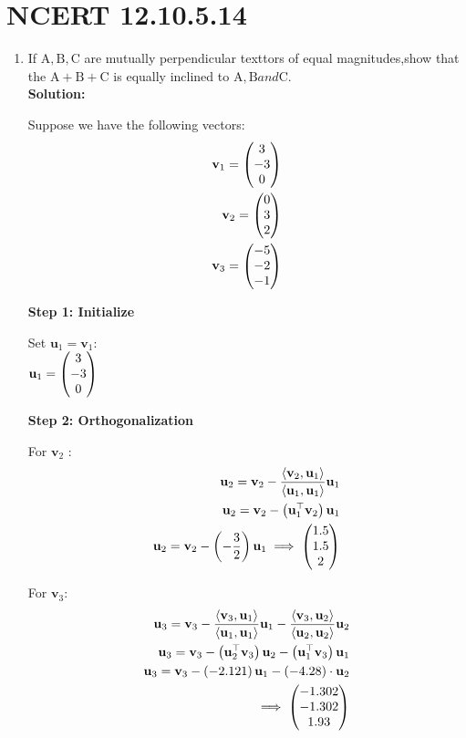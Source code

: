 \documentclass[11pt]{book}
\begin{document}
\section*{NCERT 12.10.5.14}
\begin{enumerate}
    \item If $ \text{A},\text{B},\text{C} $ are mutually perpendicular texttors of equal magnitudes,show that the  $ \text{A}+\text{B}+\text{C} $ is equally inclined to $ \text{A},\text{B} and \text{C} $.\\
    \textbf{Solution:}
    
    Suppose we have the following vectors:
    \begin{align}
        \mathbf{v}_1 = \begin{pmatrix}3 \\-3 \\0\end{pmatrix}  \\
        \mathbf{v}_2 = \begin{pmatrix}0\\ 3\\ 2\end{pmatrix}  \\
        \mathbf{v}_3 = \begin{pmatrix}-5\\-2\\ -1\end{pmatrix}
    \end{align}

\textbf{Step 1: Initialize}

Set $\mathbf{u}_1 = \mathbf{v}_1$:\\

 $\mathbf{u}_1 = \begin{pmatrix}3\\ -3\\ 0\end{pmatrix} $
 

\textbf{Step 2: Orthogonalization}

For  $ \mathbf{v}_2$ :
 \begin{align}
     \mathbf{u}_2 = \mathbf{v}_2 - \frac{\langle \mathbf{v}_2, \mathbf{u}_1 \rangle}{\langle \mathbf{u}_1, \mathbf{u}_1 \rangle} \mathbf{u}_1 \\
     \mathbf{u}_2=\mathbf{v}_2- \left(\mathbf{u}_1 ^\top \mathbf{v}_2\right) \mathbf{u}_1\\ 
     \mathbf{u}_2 = \mathbf{v}_2 - \left(-\frac{3}{2}\right) \mathbf{u}_1 
     \implies \begin{pmatrix}1.5\\1.5\\2 \end{pmatrix}
 \end{align}

For $\mathbf{v}_3 $:
\begin{align}
    \mathbf{u}_3 = \mathbf{v}_3 - \frac{\langle \mathbf{v}_3, \mathbf{u}_1 \rangle}{\langle \mathbf{u}_1, \mathbf{u}_1 \rangle} \mathbf{u}_1 - \frac{\langle \mathbf{v}_3, \mathbf{u}_2 \rangle}{\langle \mathbf{u}_2, \mathbf{u}_2 \rangle} \mathbf{u}_2 \\
    \mathbf{u}_3=\mathbf{v}_3- \left(\mathbf{u}_2 ^\top \mathbf{v}_3\right) \mathbf{u}_2- \left(\mathbf{u}_1 ^\top \mathbf{v}_3\right) \mathbf{u}_1\\ 
\mathbf{u}_3 = \mathbf{v}_3 - \left(-2.121\right) \mathbf{u}_1 - \left(-4.28\right) \cdot \mathbf{u}_2 \\
\implies\begin{pmatrix}-1.302\\ -1.302\\ 1.93\end{pmatrix} 
\end{align}


\end{enumerate}
\end{document}
